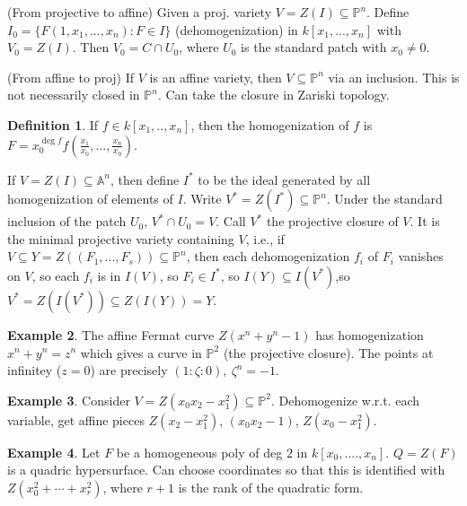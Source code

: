 \documentclass{article}
\theoremstyle{definition}
\newtheorem{defn}{Definition}[section]
\newtheorem{example}[defn]{Example}
\theoremstyle{remark}
\theoremstyle{plain}
\newcommand{\PP}{\mathbb{P}}
\newcommand{\bA}{\mathbb{A}}
\begin{document}
(From projective to affine) Given a proj. variety $V=Z(I)\subseteq\PP^n$. Define $I_0=\{F(1,x_1,...,x_n):F\in I\}$ (dehomogenization) in $k[x_1,...,x_n]$ with $V_0=Z(I)$. Then $V_0=C\cap U_0$, where $U_0$ is the standard patch with $x_0\neq0$.

(From affine to proj) If $V$ is an affine variety, then $V\subseteq \PP^n$ via an inclusion. This is not necessarily closed in $\PP^n$. Can take the closure in Zariski topology.
\begin{defn}
    If $f\in k[x_1,..,x_n]$, then the homogenization of $f$ is $F=x_0^{\deg f}f(\frac{x_1}{x_0},\ldots,\frac{x_n}{x_0})$.
\end{defn}
If $V=Z(I)\subseteq \bA^n$, then define $I^\ast$ to be the ideal generated by all homogenization of elements of $I$. Write $V^\ast=Z(I^\ast)\subseteq\PP^n$. Under the standard inclusion of the patch $U_0$, $V^\ast\cap U_0=V$. Call $V^\ast$ the projective closure of $V$. It is the minimal projective variety containing $V$, i.e., if $V\subseteq Y=Z((F_1,...,F_s))\subseteq\PP^n$, then each dehomogenization $f_i$ of $F_i$ vanishes on $V$, so each $f_i$ is in $I(V)$, so $F_i\in I^\ast$, so $I(Y)\subseteq I(V^\ast)$,so $V^\ast=Z(I(V^\ast))\subseteq Z(I(Y))=Y$.
\begin{example}
    The affine Fermat curve $Z(x^n+y^n-1)$ has homogenization $x^n+y^n=z^n$ which gives a curve in $\PP^2$ (the projective closure). The points at infinitey ($z=0$) are precisely  $(1:\zeta:0),\ \zeta^n=-1$. 
\end{example}
\begin{example}
    Consider $V=Z(x_0x_2-x_1^2)\subseteq\PP^2$. Dehomogenize w.r.t. each variable, get affine pieces $Z(x_2-x_1^2)$,  $(x_0x_2-1)$, $Z(x_0-x_1^2)$.
\end{example}
\begin{example}
    Let $F$ be a homogeneous poly of deg $2$ in $k[x_0,....,x_n]$. $Q=Z(F)$ is a quadric hypersurface. Can choose coordinates so that this is identified with $Z(x_0^2+\cdots+x_r^2)$, where $r+1$ is the rank of the quadratic form.
\end{example}
\end{document}
